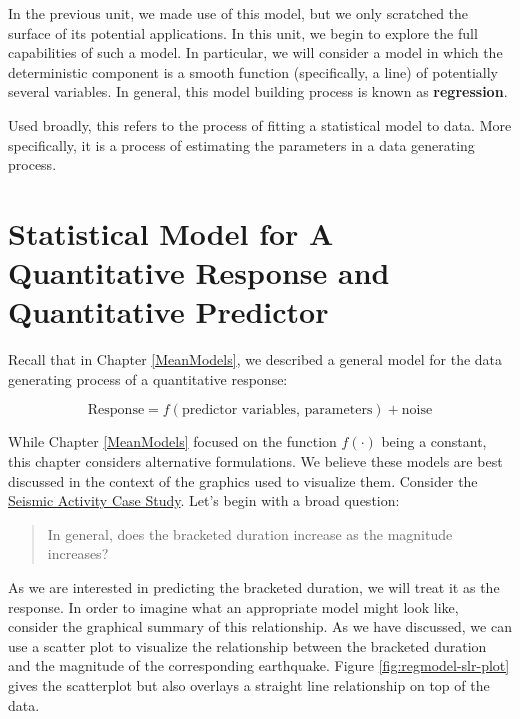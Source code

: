 \documentclass[]{book}
\theoremstyle{plain}
\theoremstyle{mydefn}
\theoremstyle{myexmpl}
\theoremstyle{remark}
\let\BeginKnitrBlock\begin \let\EndKnitrBlock\end
\let\BeginKnitrBlock\begin \let\EndKnitrBlock\end
\begin{document}
In the previous unit, we made use of this model, but we only scratched
the surface of its potential applications. In this unit, we begin to
explore the full capabilities of such a model. In particular, we will
consider a model in which the deterministic component is a smooth
function (specifically, a line) of potentially several variables. In
general, this model building process is known as \textbf{regression}.

\BeginKnitrBlock{definition}[Regression]
\protect\hypertarget{def:defn-regression}{}{\label{def:defn-regression}
{} }Used broadly, this refers to the process of
fitting a statistical model to data. More specifically, it is a process
of estimating the parameters in a data generating process.
\EndKnitrBlock{definition}

\section{Statistical Model for A Quantitative Response and Quantitative
Predictor}\label{statistical-model-for-a-quantitative-response-and-quantitative-predictor}

Recall that in Chapter \ref{MeanModels}, we described a general model
for the data generating process of a quantitative response:

\[\text{Response} = f(\text{predictor variables, parameters}) + \text{noise}\]

While Chapter \ref{MeanModels} focused on the function \(f(\cdot)\)
being a constant, this chapter considers alternative formulations. We
believe these models are best discussed in the context of the graphics
used to visualize them. Consider the
\protect\hyperlink{CaseGreece}{Seismic Activity Case Study}. Let's begin
with a broad question:

\begin{quote}
In general, does the bracketed duration increase as the magnitude
increases?
\end{quote}

As we are interested in predicting the bracketed duration, we will treat
it as the response. In order to imagine what an appropriate model might
look like, consider the graphical summary of this relationship. As we
have discussed, we can use a scatter plot to visualize the relationship
between the bracketed duration and the magnitude of the corresponding
earthquake. Figure \ref{fig:regmodel-slr-plot} gives the scatterplot but
also overlays a straight line relationship on top of the data.
\end{document}
